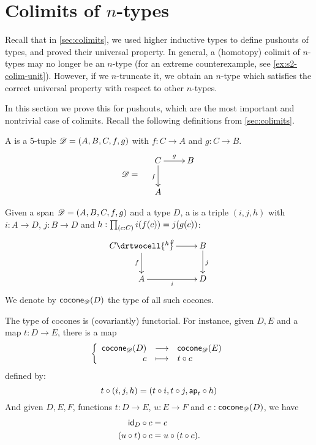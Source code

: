 %

\section{Colimits of \texorpdfstring{$n$}{n}-types}
\label{sec:pushouts}

Recall that in \autoref{sec:colimits}, we used higher inductive types to define pushouts of types, and proved their universal property.
In general, a (homotopy) colimit of $n$-types may no longer be an $n$-type (for an extreme counterexample, see \autoref{ex:s2-colim-unit}).
However, if we $n$-truncate it, we obtain an $n$-type which satisfies the correct universal property with respect to other $n$-types.

In this section we prove this for pushouts, which are the most important and nontrivial case of colimits.
Recall the following definitions from \autoref{sec:colimits}.

\begin{defn}
  A  %
  is a 5-tuple $\mathscr{D}=(A,B,C,f,g)$ with %
  $f:C\to{}A$ and $g:C\to{}B$.
  \[\Ddiag=\quad\vcenter{\xymatrix{C \ar^g[r] \ar_f[d] & B \\ A & }}\]
\end{defn}

\begin{defn}
  Given a span $\mathscr{D}=(A,B,C,f,g)$ and a type $D$, a %
   is a triple $(i, j, h)$
  with $i:A\to{}D$, $j:B\to{}D$ and $h : \prd{c:C}i(f(c))=j(g(c))$:
  \[\uppercurveobject{{ }}\lowercurveobject{{ }}\twocellhead{{ }}
  \xymatrix{C \ar^g[r] \ar_f[d] \drtwocell{^h} & B \ar^j[d] \\ A \ar_i[r] & D
  }\]
  We denote by $\mathsf{cocone}_{\mathscr{D}}(D)$ the type of all such cocones.
\end{defn}

The type of cocones is (covariantly) functorial.
For instance, given $D,E$ %
and a map $t:D\to{}E$, there is a map
  \[\left\{\begin{array}{rcl}\mathsf{cocone}_{\mathscr{D}}(D) & \longrightarrow & \mathsf{cocone}_{\mathscr{D}}(E) \\ c & \longmapsto & t\circ c \end{array}\right.\]
  defined by:
  \[t\circ(i,j,h)=(t\circ{}i,t\circ{}j,\mathsf{ap}_{t}\circ{}h)\]
And given $D,E,F$, %
functions $t:D\to{}E$, $u:E\to{}F$ and $c:\mathsf{cocone}_{\mathscr{D}}(D)$, we have
\begin{align}
  \composecocone{\idfunc[D]}c &= c \label{eq:composeconeid}\\
  \composecocone{(u\circ{}t)}c&=\composecocone{u}(\composecocone{t}c). \label{eq:composeconefunc}
\end{align}

